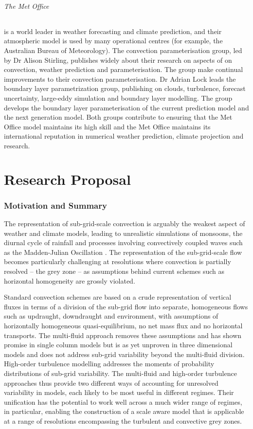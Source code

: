 \documentclass[11pt,a4paper]{article}
\begin{document}
\paragraph*{The Met Office} is a world leader in weather forecasting and climate prediction, and their atmospheric model is used by many operational centres (for example, the Australian Bureau of Meteorology). The convection parameterisation group, led by Dr Alison Stirling, publishes widely about their research on aspects of on convection, weather prediction and parameterisation. The group make continual improvements to their convection parameterisation. Dr Adrian Lock leads the boundary layer parametrization group, publishing on clouds, turbulence, forecast uncertainty, large-eddy simulation and boundary layer modelling. The group develops the boundary layer parameterisation of the current prediction model and the next generation model. Both groups contribute to ensuring that the Met Office model maintains its high skill and the Met Office maintains its international reputation in numerical weather prediction, climate projection and research. 

\newpage

\part{Research Proposal}

\section{Motivation and Summary}

The representation of sub-grid-scale convection is arguably the weakest aspect of weather and climate models, leading to unrealistic simulations of monsoons, the diurnal cycle of rainfall and processes involving convectively coupled waves such as the Madden-Julian Oscillation \cite[]{SAB+13,HPB+14}. The representation of the sub-grid-scale flow becomes particularly challenging at resolutions where convection is partially resolved -- the grey zone -- as assumptions behind current schemes such as horizontal homogeneity are grossly violated.

Standard convection schemes are based on a crude representation of vertical fluxes in terms of a division of the sub-grid flow into separate, homogeneous flows such as updraught, downdraught and environment, with assumptions of horizontally homogeneous quasi-equilibrium, no net mass flux and no horizontal transports. The multi-fluid approach removes these assumptions and has shown promise in single column models but is as yet unproven in three dimensional models and does not address sub-grid variability beyond the multi-fluid division. High-order turbulence modelling addresses the moments of probability distributions of sub-grid variability. The multi-fluid and high-order turbulence approaches thus provide two different ways of accounting for unresolved variability in models, each likely to be most useful in different regimes. Their unification has the potential to work well across a much wider range of regimes, in particular, enabling the construction of a scale aware model that is applicable at a range of resolutions encompassing the turbulent and convective grey zones.
\end{document}
